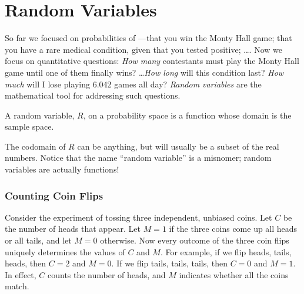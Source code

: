 \chapter{Random Variables}

So far we focused on probabilities of  ---that you win the
Monty Hall game; that you have a rare medical condition, given that you
tested positive; \dots.  Now we focus on quantitative questions: \emph{How
  many} contestants must play the Monty Hall game until one of them
finally wins? \dots {\em How long} will this condition last?  {\em How
  much} will I lose playing 6.042 games all day?  \emph{Random variables}
are the mathematical tool for addressing such questions.



\begin{definition}
  A random variable, $R$, on a probability space is a function whose
  domain is the sample space.
\end{definition}
The codomain of $R$ can be anything, but will usually be a subset of the
real numbers.  Notice that the name ``random variable'' is a misnomer;
random variables are actually functions!

\subsection{Counting Coin Flips}
Consider the experiment of tossing three independent, unbiased coins.  Let
$C$ be the number of heads that appear.  Let $M = 1$ if the three coins
come up all heads or all tails, and let $M = 0$ otherwise.  Now every
outcome of the three coin flips uniquely determines the values of $C$ and
$M$.  For example, if we flip heads, tails, heads, then $C = 2$ and $M =
0$.  If we flip tails, tails, tails, then $C = 0$ and $M = 1$.  In effect,
$C$ counts the number of heads, and $M$ indicates whether all the coins
match.

